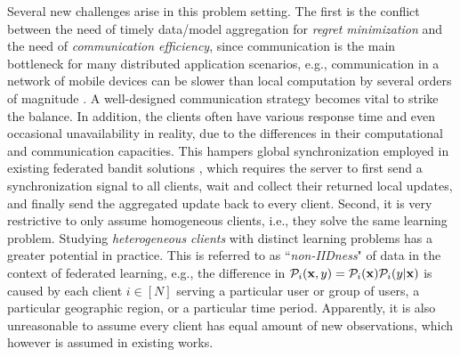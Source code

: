 Several new challenges arise in this problem setting. 
The first is the conflict between the need of timely data/model aggregation for \emph{regret minimization} and the need of \emph{communication efficiency}, since communication is the main bottleneck for many distributed application scenarios, e.g., communication in a network of mobile devices can be slower than local computation by several orders of magnitude \citep{huang2013depth}. A well-designed communication strategy becomes vital to strike the balance. 
In addition, 
the clients often have various response time and even occasional unavailability in reality, due to the differences in their computational and communication capacities.
This hampers global synchronization employed in existing federated bandit solutions \citep{wang2019distributed,dubey2020differentially}, which requires the server to first send a synchronization signal to all clients, wait and collect their returned local updates, and finally send the aggregated update back to every client.
Second, it is very restrictive to only assume homogeneous clients, i.e., they solve the same learning problem. 
Studying \emph{heterogeneous clients} with distinct learning problems has a greater potential in practice.
This is referred to as ``\emph{non-IIDness}" of data in the context of federated learning, e.g., the difference in $\mathcal{P}_{i}(\mathbf{x},y)=\mathcal{P}_{i}(\mathbf{x}) \mathcal{P}_{i}(y|\mathbf{x})$ is caused by each client $i\in[N]$ serving a particular user or group of users, a particular geographic region, or a particular time period. Apparently, it is also unreasonable to assume every client has equal amount of new observations, which however is assumed in existing works. 

